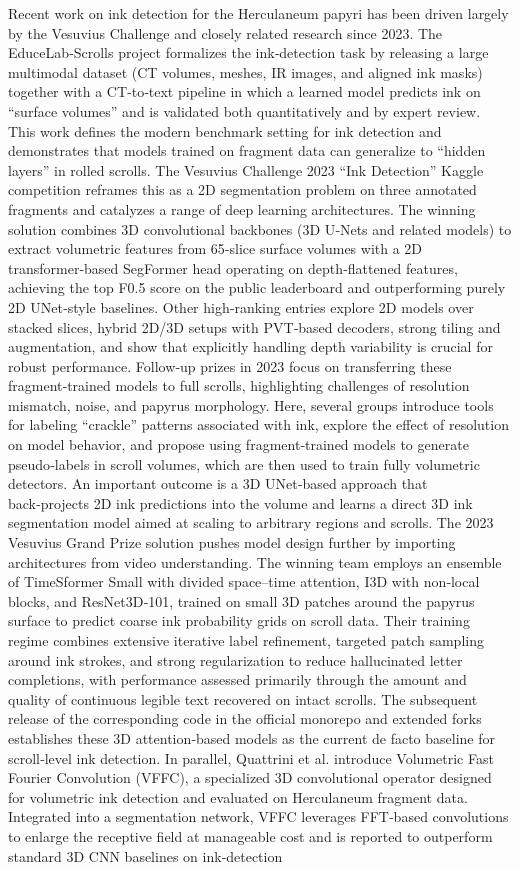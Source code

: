\documentclass[runningheads]{llncs}
\begin{document}
Recent work on ink detection for the Herculaneum papyri has been driven largely by the Vesuvius Challenge and closely related research since 2023. The EduceLab‑Scrolls project formalizes the ink‑detection task by releasing a large multimodal dataset (CT volumes, meshes, IR images, and aligned ink masks) together with a CT‑to‑text pipeline in which a learned model predicts ink on “surface volumes” and is validated both quantitatively and by expert review. This work defines the modern benchmark setting for ink detection and demonstrates that models trained on fragment data can generalize to “hidden layers” in rolled scrolls. The Vesuvius Challenge 2023 “Ink Detection” Kaggle competition reframes this as a 2D segmentation problem on three annotated fragments and catalyzes a range of deep learning architectures. The winning solution combines 3D convolutional backbones (3D U‑Nets and related models) to extract volumetric features from 65‑slice surface volumes with a 2D transformer‑based SegFormer head operating on depth‑flattened features, achieving the top F0.5 score on the public leaderboard and outperforming purely 2D UNet‑style baselines. Other high‑ranking entries explore 2D models over stacked slices, hybrid 2D/3D setups with PVT‑based decoders, strong tiling and augmentation, and show that explicitly handling depth variability is crucial for robust performance. Follow‑up prizes in 2023 focus on transferring these fragment‑trained models to full scrolls, highlighting challenges of resolution mismatch, noise, and papyrus morphology. Here, several groups introduce tools for labeling “crackle” patterns associated with ink, explore the effect of resolution on model behavior, and propose using fragment‑trained models to generate pseudo‑labels in scroll volumes, which are then used to train fully volumetric detectors. An important outcome is a 3D UNet‑based approach that back‑projects 2D ink predictions into the volume and learns a direct 3D ink segmentation model aimed at scaling to arbitrary regions and scrolls. The 2023 Vesuvius Grand Prize solution pushes model design further by importing architectures from video understanding. The winning team employs an ensemble of TimeSformer Small with divided space–time attention, I3D with non‑local blocks, and ResNet3D‑101, trained on small 3D patches around the papyrus surface to predict coarse ink probability grids on scroll data. Their training regime combines extensive iterative label refinement, targeted patch sampling around ink strokes, and strong regularization to reduce hallucinated letter completions, with performance assessed primarily through the amount and quality of continuous legible text recovered on intact scrolls. The subsequent release of the corresponding code in the official monorepo and extended forks establishes these 3D attention‑based models as the current de facto baseline for scroll‑level ink detection. In parallel, Quattrini et al. introduce Volumetric Fast Fourier Convolution (VFFC), a specialized 3D convolutional operator designed for volumetric ink detection and evaluated on Herculaneum fragment data. Integrated into a segmentation network, VFFC leverages FFT‑based convolutions to enlarge the receptive field at manageable cost and is reported to outperform standard 3D CNN baselines on ink‑detection 
\end{document}
